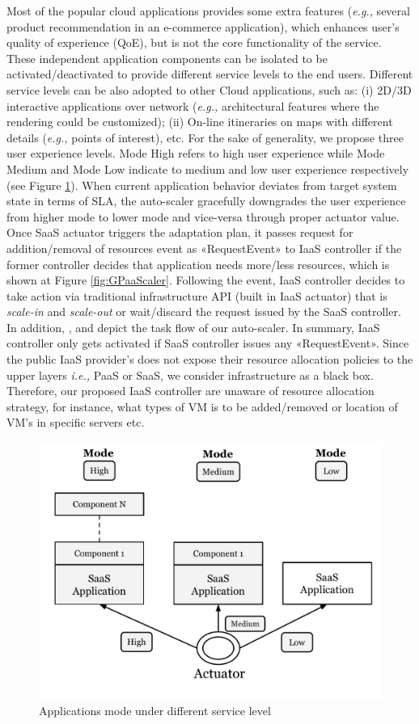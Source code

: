 Most of the popular cloud applications provides some extra features (\emph{e.g.,} several product recommendation in an e-commerce application), which enhances user’s quality of experience (QoE), but is not the core functionality of the service. These independent application
components can be isolated to be activated/deactivated to provide different service levels to the end users. Different service levels can be also adopted to other Cloud applications, such as: (i) 2D/3D interactive applications over network (\emph{e.g.,} architectural features where the rendering could be customized); (ii) On-line itineraries on maps with different details (\emph{e.g.,} points of interest), etc.
For the sake of generality, we propose three user experience levels. Mode High refers to high user
experience while Mode Medium and Mode Low indicate to medium and low user experience respectively (see Figure \ref{fig:modes}). 
When current application behavior deviates from target system state in terms of SLA, the auto-scaler gracefully downgrades the user experience from higher mode to lower mode and vice-versa through proper actuator value. Once SaaS actuator triggers the adaptation plan, it passes request for addition/removal of resources event as «RequestEvent» to IaaS controller if the former controller decides that application needs more/less resources, which is shown at Figure \ref{fig:GPaaScaler}. Following the event, IaaS controller decides to take action via traditional infrastructure API (built in IaaS actuator) that is \emph{scale-in} and \emph{scale-out} or wait/discard the request issued by the SaaS controller.
In addition, ,  and  depict the task flow of our auto-scaler.
In summary, IaaS controller only gets activated if SaaS controller issues any «RequestEvent». Since the public IaaS provider's does not expose their resource allocation policies to the upper layers \emph{i.e.,} PaaS or SaaS, we consider infrastructure as a black box. Therefore, our proposed IaaS controller are unaware of resource allocation strategy, for instance, what types of VM is to be added/removed or location of VM's in specific servers etc.




\begin{figure} [ht]
\centering
\includegraphics[scale=.32]{Graphs/action_1.pdf}
\caption{Applications mode under different service level}
\label{fig:modes}
\end{figure}

